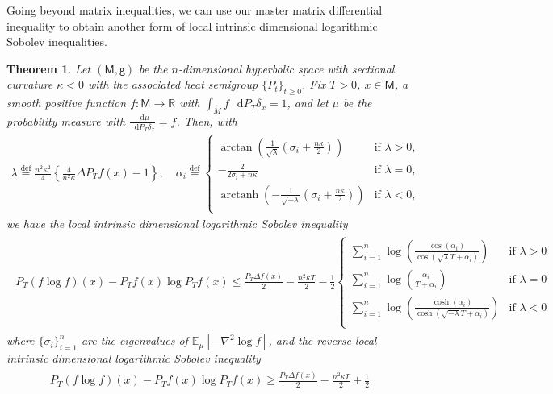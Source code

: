 \documentclass[a4paper,twoside,11pt,reqno]{amsart}
\newcommand{\eqdef}{\stackrel{\mathrm{def}}{=}}
\newtheorem{theorem}{Theorem}
\newcommand*\diff{\mathop{}\!\mathrm{d}}
\newcommand{\R}{\mathbb{R}} %
\DeclareMathOperator{\arctanh}{arctanh}
\newcommand{\MM}{\mathsf{M}}
\newcommand{\GG}{\mathsf{g}}
\newcommand{\mb}{\mathbb}
\begin{document}
Going beyond matrix inequalities, we can use our master matrix differential inequality to obtain another form of local intrinsic dimensional logarithmic Sobolev inequalities.
\begin{theorem}
\label{thm:nge_curved_intro}
Let $(\MM,\GG)$ be the $n$-dimensional hyperbolic space with sectional curvature $\kappa<0$ with the associated  heat semigroup $\{P_t\}_{t\ge 0}$. Fix $T>0$, $x\in\MM$, a smooth positive function $f:\MM\to\R$ with $\int_M f\,\diff P_T\delta_x=1$,
and let $\mu$ be the probability measure with $\frac{\diff\mu}{\diff P_T\delta_x}=f$. 
Then, with
\begin{align}
\lambda\eqdef \frac{n^2\kappa^2}{4}\left\{\frac{4}{n^2\kappa}\Delta P_Tf(x)-1\right\}, \quad 
\alpha_i\eqdef
\begin{cases}
\arctan\left(\frac{1}{\sqrt{\lambda}}\left(\sigma_i+\frac{n\kappa}{2}\right)\right)  &\text{if }\lambda>0,\\
-\frac{2}{2\sigma_i+n\kappa}  &\text{if }\lambda=0,\\
\arctanh\left(-\frac{1}{\sqrt{-\lambda}}\left(\sigma_i+\frac{n\kappa}{2}\right)\right)&\text{if }\lambda<0,\\
\end{cases}
\end{align}
we have the local intrinsic dimensional logarithmic Sobolev inequality
\begin{align} \label{eq:manifolds-lsi_nonpos}
\begin{split}
P_T(f\log f)(x)-P_Tf(x)\log P_Tf(x)\leq \frac{ P_T\Delta f(x)}{2}-\frac{n^2\kappa T}{2}-\frac{1}{2}
\begin{cases}
\sum_{i=1}^n\log\left(\frac{\cos (\alpha_i)}{\cos(\sqrt{\lambda}T+\alpha_i)}\right)&\text{if }\lambda>0\\
\sum_{i=1}^n\log\left(\frac{\alpha_i}{T+\alpha_i}\right) &\text{if }\lambda=0\\
\sum_{i=1}^n\log\left(\frac{\cosh (\alpha_i)}{\cosh(\sqrt{-\lambda}T+\alpha_i)}\right) &\text{if }\lambda<0\\
\end{cases}
\end{split}
\end{align}
where $\{\sigma_i\}_{i=1}^n$ are the eigenvalues of $\mb{E}_{\mu}[-\nabla^2\log f]$, and the reverse local intrinsic dimensional logarithmic Sobolev inequality
\begin{align} \label{eq:manifolds-rev-lsi_nonpos}
\begin{split}
P_T(f\log f)(x)-P_Tf(x)\log P_Tf(x)\geq \frac{ P_T\Delta f(x)}{2}-\frac{n^2\kappa T}{2}+\frac{1}{2}

\end{split}
\end{align}
\end{theorem}
\end{document}
